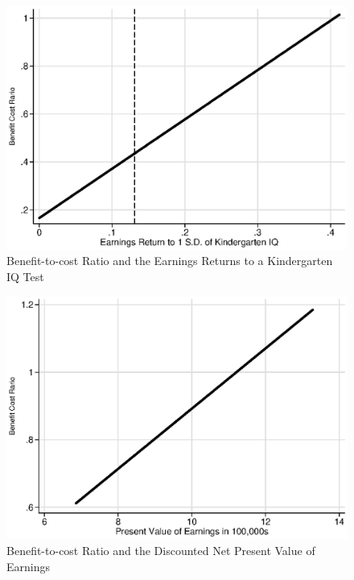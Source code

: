 \begin{center}
\begin{figure}[H] 
\caption{Benefit-to-cost Ratio and the Earnings Returns to a Kindergarten IQ Test} \label{figure:first}
\centering
\includegraphics[width=.65\columnwidth]{Output/abc_chettytype_return.eps}
\end{figure}
\end{center}

\begin{center}
\begin{figure}[H] 
\caption{Benefit-to-cost Ratio and the Discounted Net Present Value of Earnings}
\label{figuresecond}
\centering
\includegraphics[width=.65\columnwidth]{Output/abc_chettytype_pv.eps}
\end{figure}
\end{center}